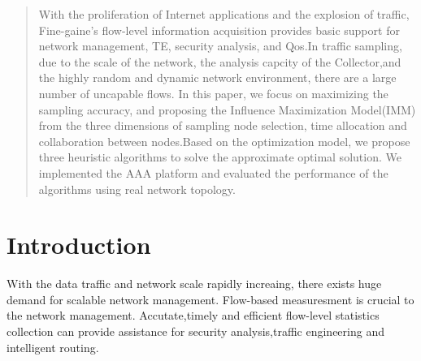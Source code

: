 \documentclass[conference,compsoc]{IEEEtran}
\begin{document}




\maketitle

\begin{abstract}
With the proliferation of Internet applications and the explosion of traffic, Fine-gaine's flow-level information acquisition provides basic support for network management, TE, security analysis, and Qos.In traffic sampling, due to the scale of the network, the analysis capcity of the Collector,and the highly random and dynamic network environment, there are a large number of uncapable flows. In this paper, we focus on maximizing the sampling accuracy, and proposing the Influence Maximization Model(IMM) from the three dimensions of sampling node selection, time allocation and collaboration between nodes.Based on the optimization model, we propose three heuristic algorithms to solve the approximate optimal solution. We implemented the AAA platform and evaluated the performance of the algorithms using real network topology. 
\end{abstract}





%
\IEEEpeerreviewmaketitle



\section{Introduction}

With the data traffic and network scale rapidly increaing, there exists huge demand for scalable network management. Flow-based measuresment is crucial to the network management. Accutate,timely and efficient flow-level statistics collection can provide assistance for security analysis,traffic engineering and intelligent routing. 
\end{document}

